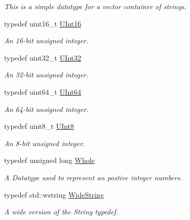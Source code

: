 \begin{DoxyCompactItemize}
\begin{DoxyCompactList}\small\item\em This is a simple datatype for a vector container of strings. \end{DoxyCompactList}\item 
\hypertarget{namespaceMezzanine_a1b6c09063432c7ddd87011c88306c767}{typedef uint16\-\_\-t \hyperlink{namespaceMezzanine_a1b6c09063432c7ddd87011c88306c767}{U\-Int16}}\label{namespaceMezzanine_a1b6c09063432c7ddd87011c88306c767}

\begin{DoxyCompactList}\small\item\em An 16-\/bit unsigned integer. \end{DoxyCompactList}\item 
\hypertarget{namespaceMezzanine_abea3b8e8e9b03d2547b2800284ba682d}{typedef uint32\-\_\-t \hyperlink{namespaceMezzanine_abea3b8e8e9b03d2547b2800284ba682d}{U\-Int32}}\label{namespaceMezzanine_abea3b8e8e9b03d2547b2800284ba682d}

\begin{DoxyCompactList}\small\item\em An 32-\/bit unsigned integer. \end{DoxyCompactList}\item 
\hypertarget{namespaceMezzanine_ac690bcdbbe92a684875c5e8b16a33097}{typedef uint64\-\_\-t \hyperlink{namespaceMezzanine_ac690bcdbbe92a684875c5e8b16a33097}{U\-Int64}}\label{namespaceMezzanine_ac690bcdbbe92a684875c5e8b16a33097}

\begin{DoxyCompactList}\small\item\em An 64-\/bit unsigned integer. \end{DoxyCompactList}\item 
\hypertarget{namespaceMezzanine_aa5f38583d9025e05fa33d6e32e97b457}{typedef uint8\-\_\-t \hyperlink{namespaceMezzanine_aa5f38583d9025e05fa33d6e32e97b457}{U\-Int8}}\label{namespaceMezzanine_aa5f38583d9025e05fa33d6e32e97b457}

\begin{DoxyCompactList}\small\item\em An 8-\/bit unsigned integer. \end{DoxyCompactList}\item 
typedef unsigned long \hyperlink{namespaceMezzanine_adcbb6ce6d1eb4379d109e51171e2e493}{Whole}
\begin{DoxyCompactList}\small\item\em A Datatype used to represent an postive integer numbers. \end{DoxyCompactList}\item 
typedef std\-::wstring \hyperlink{namespaceMezzanine_a08b3adb0d2632e4f6a454fdf3cf5efda}{Wide\-String}
\begin{DoxyCompactList}\small\item\em A wide version of the String typedef. \end{DoxyCompactList}\end{DoxyCompactItemize}
